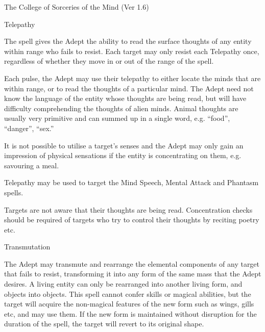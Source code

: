 \begin{Chapter}{The College of Sorceries of the Mind (Ver 1.6)}
\begin{spell}[S-9]{Telepathy}
\begin{effects}
The spell gives the Adept the ability to read the surface thoughts of
any entity within range who fails to resist. Each target may only
resist each Telepathy once, regardless of whether they move in or out
of the range of the spell.

Each pulse, the Adept may use their telepathy to either locate the
minds that are within range, or to read the thoughts of a particular
mind.  The Adept need not know the language of the entity whose
thoughts are being read, but will have difficulty comprehending the
thoughts of alien minds.  Animal thoughts are usually very primitive
and can summed up in a single word, e.g. “food”, “danger”, “sex.”

It is not possible to utilise a target’s senses and the Adept may only
gain an impression of physical sensations if the entity is
concentrating on them, e.g. savouring a meal.

Telepathy may be used to target the Mind Speech, Mental Attack and
Phantasm spells.

Targets are not aware that their thoughts are being read.
Concentration checks should be required of targets who try to control
their thoughts by reciting poetry etc.
\end{effects}
\end{spell}

\begin{spell}[S-10]{Transmutation}

\begin{effects}
The Adept may transmute and rearrange the elemental components of any
target that fails to resist, transforming it into any form of the same
mass that the Adept desires.  A living entity can only be rearranged
into another living form, and objects into objects. This spell cannot
confer skills or magical abilities, but the target will acquire the
non-magical features of the new form such as wings, gills etc, and may
use them. If the new form is maintained without disruption for the
duration of the spell, the target will revert to its original shape.
\end{effects}
\end{spell}

\end{Chapter}
